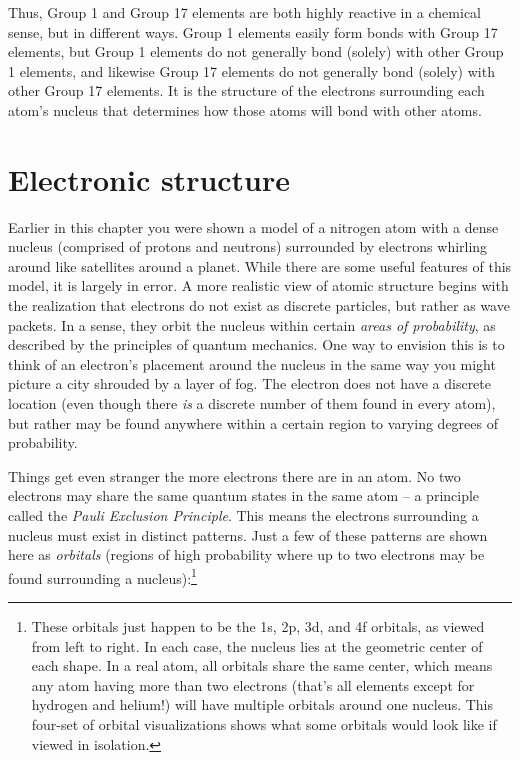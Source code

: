 Thus, Group 1 and Group 17 elements are both highly reactive in a chemical sense, but in different ways.  Group 1 elements easily form bonds with Group 17 elements, but Group 1 elements do not generally bond (solely) with other Group 1 elements, and likewise Group 17 elements do not generally bond (solely) with other Group 17 elements.  It is the structure of the electrons surrounding each atom's nucleus that determines how those atoms will bond with other atoms.







\filbreak
\section{Electronic structure}

\label{Electronic structure}

Earlier in this chapter you were shown a model of a nitrogen atom with a dense nucleus (comprised of protons and neutrons) surrounded by electrons whirling around like satellites around a planet.  While there are some useful features of this model, it is largely in error.  A more realistic view of atomic structure begins with the realization that electrons do not exist as discrete particles, but rather as wave packets.  In a sense, they orbit the nucleus within certain \textit{areas of probability}, as described by the principles of quantum mechanics.  One way to envision this is to think of an electron's placement around the nucleus in the same way you might picture a city shrouded by a layer of fog.  The electron does not have a discrete location (even though there \textit{is} a discrete number of them found in every atom), but rather may be found anywhere within a certain region to varying degrees of probability.

Things get even stranger the more electrons there are in an atom.  No two electrons may share the same quantum states in the same atom -- a principle called the \textit{Pauli Exclusion Principle}.  This means the electrons surrounding a nucleus must exist in distinct patterns.  Just a few of these patterns are shown here as \textit{orbitals} (regions of high probability where up to two electrons may be found surrounding a nucleus):\footnote{These orbitals just happen to be the 1s, 2p, 3d, and 4f orbitals, as viewed from left to right.  In each case, the nucleus lies at the geometric center of each shape.  In a real atom, all orbitals share the same center, which means any atom having more than two electrons (that's all elements except for hydrogen and helium!) will have multiple orbitals around one nucleus.  This four-set of orbital visualizations shows what some orbitals would look like if viewed in isolation.}      

